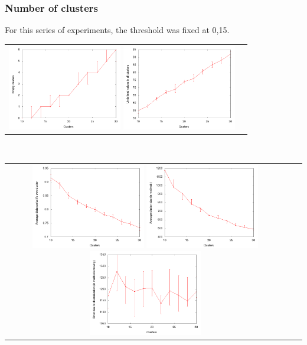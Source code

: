 \documentclass[12pt]{article}
\begin{document}
\subsubsection{Number of clusters}
For this series of experiments, the threshold was fixed at 0,15. 
\\
\begin{center}
\begin{tabular}{c c}
\includegraphics[width=5cm]{images/emptyCluster.png}
\includegraphics[width=5cm]{images/questionMark.png}
\end{tabular}\\
\begin{tabular}{c c c}
\hspace*{-0,5cm}
\includegraphics[width=5cm]{images/averageDist.png}
\includegraphics[width=5cm]{images/averageClusterSize.png}
\includegraphics[width=5cm]{images/switched.png}
\end{tabular}
\end{center}
\end{document}

